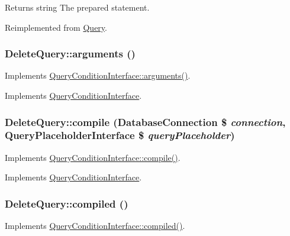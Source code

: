 \begin{DoxyReturn}{Returns}
string The prepared statement. 
\end{DoxyReturn}


Reimplemented from \hyperlink{classQuery_a16c3a3265666b784d49ce18a6fda9a8a}{Query}.\hypertarget{classDeleteQuery_a16b4a6f2068378e594ed3d99e8e05a98}{
\subsubsection[{arguments}]{\setlength{\rightskip}{0pt plus 5cm}DeleteQuery::arguments ()}}
\label{classDeleteQuery_a16b4a6f2068378e594ed3d99e8e05a98}
Implements \hyperlink{interfaceQueryConditionInterface_ac2349e02d5332412182cf472ba1a1b1e}{QueryConditionInterface::arguments()}. 

Implements \hyperlink{interfaceQueryConditionInterface_ac2349e02d5332412182cf472ba1a1b1e}{QueryConditionInterface}.\hypertarget{classDeleteQuery_a62db6fe45f790c20479b6844ba58ac83}{
\subsubsection[{compile}]{\setlength{\rightskip}{0pt plus 5cm}DeleteQuery::compile ({\bf DatabaseConnection} \$ {\em connection}, \/  {\bf QueryPlaceholderInterface} \$ {\em queryPlaceholder})}}
\label{classDeleteQuery_a62db6fe45f790c20479b6844ba58ac83}
Implements \hyperlink{interfaceQueryConditionInterface_ad409672ac9ac50787eec52ecdf5a60b1}{QueryConditionInterface::compile()}. 

Implements \hyperlink{interfaceQueryConditionInterface_ad409672ac9ac50787eec52ecdf5a60b1}{QueryConditionInterface}.\hypertarget{classDeleteQuery_a5f30ca2a90863366b492bc1a3b09ae24}{
\subsubsection[{compiled}]{\setlength{\rightskip}{0pt plus 5cm}DeleteQuery::compiled ()}}
\label{classDeleteQuery_a5f30ca2a90863366b492bc1a3b09ae24}
Implements \hyperlink{interfaceQueryConditionInterface_a4aac3f4505275edecad9c22351e591cb}{QueryConditionInterface::compiled()}. 

